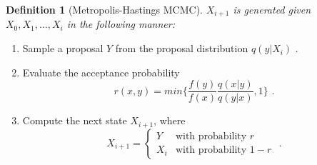 \documentclass[
  12pt,
  oneside]{book}
\theoremstyle{definition}
\newtheorem{definition}{Definition}[chapter]
\theoremstyle{definition}
\theoremstyle{definition}
\theoremstyle{remark}
\begin{document}
\begin{definition}[Metropolis-Hastings MCMC]
\protect\hypertarget{def:methas}{}{\label{def:methas} {} }\emph{\(X_{i+1}\) is generated given \(X_{0},X_{1},...,X_{i}\) in the following manner:}

\begin{enumerate}
  \item Sample a proposal $Y$ from the proposal distribution $q(y|X_{i}) \textrm{ .}$
  \item Evaluate the acceptance probability $$ r(x,y)=min \{\frac{f(y)}{f(x)} \frac{q(x|y)}{q(y|x)} ,1 \} \textrm{ .}$$
  \item Compute the next state $X_{i+1}$, where $$X_{i+1}=\begin{cases}Y & \textrm{with probability }r \\ X_{i} & \textrm{with probability }1-r \end{cases} \textrm{ .}$$
\end{enumerate}
\end{definition}
\end{document}
